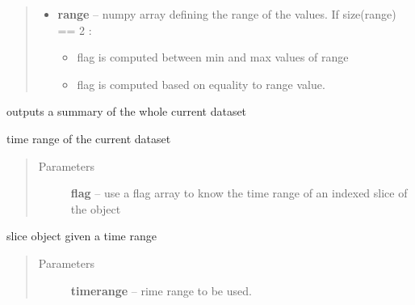 \documentclass[letterpaper,10pt,english]{sphinxmanual}
\begin{document}
\begin{fulllineitems}
\begin{fulllineitems}
\begin{quote}
\begin{description}
\begin{itemize}
\item {} 
\textbf{range} -- 
numpy array defining the range of the values. If size(range) == 2 :
\begin{itemize}
\item {} 
flag is computed between min and max values of range

\item {} 
flag is computed based on equality to range value.

\end{itemize}


\end{itemize}

\end{description}\end{quote}

\end{fulllineitems}


\begin{fulllineitems}
\label{altimetry.data:altimetry.data.hydro_data.summary}
outputs a summary of the whole current dataset

\end{fulllineitems}


\begin{fulllineitems}
\label{altimetry.data:altimetry.data.hydro_data.time_range}
time range of the current dataset
\begin{quote}\begin{description}
\item[{Parameters}] \leavevmode
\textbf{flag} -- use a flag array to know the time range of an indexed slice of the object

\end{description}\end{quote}

\end{fulllineitems}


\begin{fulllineitems}
\label{altimetry.data:altimetry.data.hydro_data.time_slice}
slice object given a time range
\begin{quote}\begin{description}
\item[{Parameters}] \leavevmode
\textbf{timerange} -- rime range to be used.


\end{description}
\end{quote}
\end{fulllineitems}
\end{fulllineitems}
\end{document}
